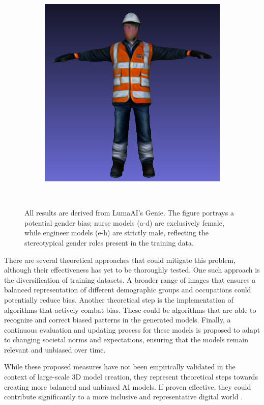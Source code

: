 \begin{figure}[H]
\begin{subfigure}[b]{0.324\textwidth}
        \includegraphics[width=\textwidth]{figures/future/bias_engineer_genie_4.png}
        \caption{}
    \end{subfigure}
    \caption{All results are derived from LumaAI's Genie. The figure portrays a potential gender bias; nurse models (a-d) are exclusively female, while engineer models (e-h) are strictly male, reflecting the stereotypical gender roles present in the training data.}~\label{fig:biasNurseEngineer}
\end{figure}

There are several theoretical approaches that could mitigate this problem, although their effectiveness has yet to be thoroughly tested. One such approach is the diversification of training datasets. A broader range of images that ensures a balanced representation of different demographic groups and occupations could potentially reduce bias. Another theoretical step is the implementation of algorithms that actively combat bias. These could be algorithms that are able to recognize and correct biased patterns in the generated models.  Finally, a continuous evaluation and updating process for these models is proposed to adapt to changing societal norms and expectations, ensuring that the models remain relevant and unbiased over time.

While these proposed measures have not been empirically validated in the context of large-scale 3D model creation, they represent theoretical steps towards creating more balanced and unbiased AI models. If proven effective, they could contribute significantly to a more inclusive and representative digital world \citep{luccioni2023stable}.

